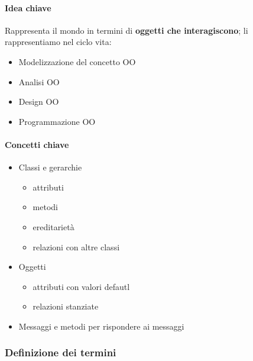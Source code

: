 \documentclass[a4paper,12pt]{article}
\begin{document}
\paragraph{Idea chiave} Rappresenta il mondo in termini di \textbf{oggetti che interagiscono}; li rappresentiamo nel ciclo vita:
\begin{itemize}
  \item Modelizzazione del concetto OO
  \item Analisi OO
  \item Design OO
  \item Programmazione OO
\end{itemize}
\paragraph{Concetti chiave}
\begin{itemize}
  \item Classi e gerarchie
  \begin{itemize}
    \item attributi 
    \item metodi
    \item ereditarietà
    \item relazioni con altre classi
  \end{itemize}
  \item Oggetti
  \begin{itemize}
    \item attributi con valori defautl
    \item relazioni stanziate
  \end{itemize}
  \item Messaggi e metodi per rispondere ai messaggi
\end{itemize}
\subsubsection{Definizione dei termini}
\end{document}
